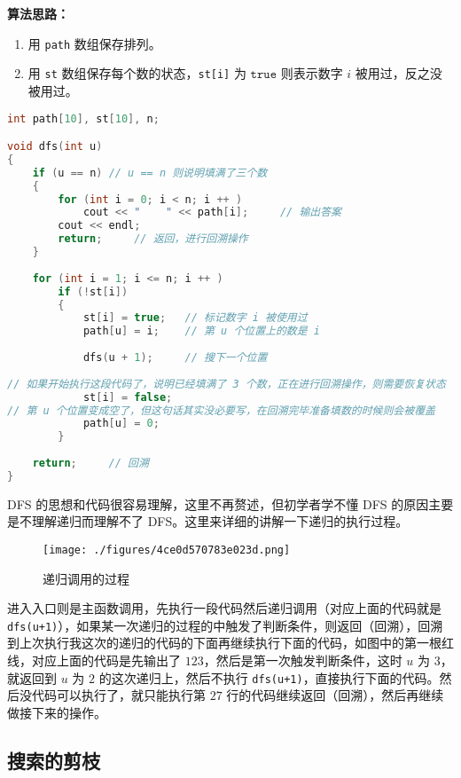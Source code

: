 \textbf{算法思路：}
\begin{enumerate}
\item 用 \verb|path| 数组保存排列。

\item 用 \verb|st| 数组保存每个数的状态，\verb|st[i]| 为 $\mathtt{true}$ 则表示数字 $i$ 被用过，反之没被用过。

\end{enumerate}
\begin{lstlisting}[language=cpp]
int path[10], st[10], n;

void dfs(int u)
{
    if (u == n) // u == n 则说明填满了三个数
    {
        for (int i = 0; i < n; i ++ )
            cout << "    " << path[i];     // 输出答案
        cout << endl;
        return;     // 返回，进行回溯操作
    }
    
    for (int i = 1; i <= n; i ++ )
        if (!st[i])
        {
            st[i] = true;   // 标记数字 i 被使用过
            path[u] = i;    // 第 u 个位置上的数是 i
            
            dfs(u + 1);     // 搜下一个位置
            
// 如果开始执行这段代码了，说明已经填满了 3 个数，正在进行回溯操作，则需要恢复状态
            st[i] = false;  
// 第 u 个位置变成空了，但这句话其实没必要写，在回溯完毕准备填数的时候则会被覆盖
            path[u] = 0;    
        }
        
    return;     // 回溯
}
\end{lstlisting}

DFS 的思想和代码很容易理解，这里不再赘述，但初学者学不懂 DFS 的原因主要是不理解递归而理解不了 DFS。这里来详细的讲解一下递归的执行过程。

\begin{figure}[ht]
\centering
\texttt{[image: ./figures/4ce0d570783e023d.png]}
\caption{递归调用的过程} \label{fig_DFS_3}
\end{figure}


进入入口则是主函数调用，先执行一段代码然后递归调用（对应上面的代码就是 \verb|dfs(u+1)|），如果某一次递归的过程的中触发了判断条件，则返回（回溯），回溯到上次执行我这次的递归的代码的下面再继续执行下面的代码，如图中的第一根红线，对应上面的代码是先输出了 $1 2 3$，然后是第一次触发判断条件，这时 $u$ 为 $3$，就返回到 $u$ 为 $2$ 的这次递归上，然后不执行 \verb|dfs(u+1)|，直接执行下面的代码。然后没代码可以执行了，就只能执行第 $27$ 行的代码继续返回（回溯），然后再继续做接下来的操作。


\subsection{搜索的剪枝}

